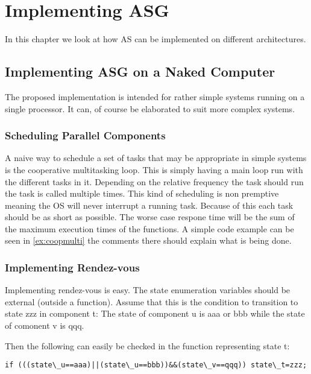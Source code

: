 \documentclass[../main.tex]{subfiles}
\begin{document}
\chapter{Implementing ASG}
In this chapter we look at how AS can be implemented on different architectures.

\section{Implementing ASG on a Naked Computer}
The proposed implementation is intended for rather simple systems running on a single processor. It can, of course be elaborated to suit more complex systems.
\subsection{Scheduling Parallel Components}
A naive way to schedule a set of tasks that may be appropriate in simple systems is the cooperative multitasking loop.
This is simply having a main loop run with the different tasks in it.
Depending on the relative frequency the task should run the task is called multiple times.
This kind of scheduling is non premptive meaning the OS will never interrupt a running task.
Because of this each task should be as short as possible.
The worse case respone time will be the sum of the maximum execution times of the functions.
A simple code example can be seen in \ref{ex:coopmulti} the comments there should explain what is being done.

%

\subsection{Implementing Rendez-vous}
Implementing rendez-vous is easy.
The state enumeration variables should be external (outside a function).
Assume that this is the condition to transition to state zzz in component t:
The state of component u is aaa or bbb while the state of comonent v is qqq.

Then the following can easily be checked in the function representing state t:
\begin{center}
\lstinline{if (((state\_u==aaa)||(state\_u==bbb))&&(state\_v==qqq)) state\_t=zzz;}
\end{center}
\end{document}

